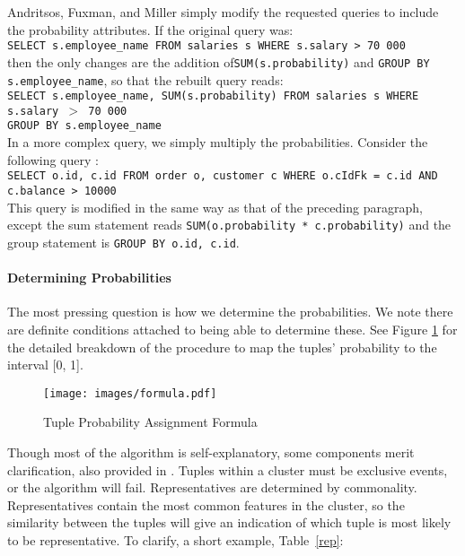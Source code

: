 \documentclass[a4paper]{report}
\begin{document}
Andritsos, Fuxman, and Miller simply modify the requested queries to include the probability attributes. If the original query was:\\
\texttt{SELECT s.employee\_name FROM salaries s WHERE s.salary > 70~000}\\
then the only changes are the addition of\texttt{SUM(s.probability)} and \texttt{GROUP BY s.employee\_name}, so that the rebuilt query reads:\\
\texttt{SELECT s.employee\_name, SUM(s.probability) FROM salaries s WHERE s.salary $>$ 70~000 \\ GROUP BY s.employee\_name}\\

In a more complex query, we simply multiply the probabilities. Consider the following query \cite{CA}: \\
\texttt{SELECT o.id, c.id FROM order o, customer c  WHERE o.cIdFk = c.id AND c.balance > 10000 } \\
This query is modified in the same way as that of the preceding paragraph, except the sum statement reads \texttt{SUM(o.probability * c.probability)} and the group statement is \texttt{GROUP BY o.id, c.id}.

\paragraph{Determining Probabilities}
The most pressing question is how we determine the probabilities. We note there are definite conditions attached to being able to determine these. See Figure \ref{formula} for the detailed breakdown of the procedure to map the tuples' probability to the interval [0, 1].

\begin{figure}[!h]
  \centering \texttt{[image: images/formula.pdf]}
  \caption[Tuple Probability Assignment Formula]{Tuple Probability Assignment Formula \cite{CA}}
  \label{formula}
\end{figure}

Though most of the algorithm is self-explanatory, some components merit clarification, also provided in \cite{CA}. Tuples within a cluster must be exclusive events, or the algorithm will fail. Representatives are determined by commonality. Representatives contain the most common features in the cluster, so the similarity between the tuples will give an indication of which tuple is most likely to be representative. To clarify, a short example, Table~\ref{rep}:
\end{document}
